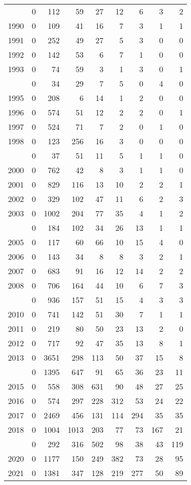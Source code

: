 \documentclass[
]{article}
\begin{document}
\begin{longtable}[t]{lrrrrrrrr}
\endfoot
\bottomrule
\endlastfoot
1989 & 0 & 112 & 59 & 27 & 12 & 6 & 3 & 2\\
1990 & 0 & 109 & 41 & 16 & 7 & 3 & 1 & 1\\
1991 & 0 & 252 & 49 & 27 & 5 & 3 & 0 & 0\\
1992 & 0 & 142 & 53 & 6 & 7 & 1 & 0 & 0\\
1993 & 0 & 74 & 59 & 3 & 1 & 3 & 0 & 1\\
\addlinespace
1994 & 0 & 34 & 29 & 7 & 5 & 0 & 4 & 0\\
1995 & 0 & 208 & 6 & 14 & 1 & 2 & 0 & 0\\
1996 & 0 & 574 & 51 & 12 & 2 & 2 & 0 & 1\\
1997 & 0 & 524 & 71 & 7 & 2 & 0 & 1 & 0\\
1998 & 0 & 123 & 256 & 16 & 3 & 0 & 0 & 0\\
\addlinespace
1999 & 0 & 37 & 51 & 11 & 5 & 1 & 1 & 0\\
2000 & 0 & 762 & 42 & 8 & 3 & 1 & 1 & 0\\
2001 & 0 & 829 & 116 & 13 & 10 & 2 & 2 & 1\\
2002 & 0 & 329 & 102 & 47 & 11 & 6 & 2 & 3\\
2003 & 0 & 1002 & 204 & 77 & 35 & 4 & 1 & 2\\
\addlinespace
2004 & 0 & 184 & 102 & 34 & 26 & 13 & 1 & 1\\
2005 & 0 & 117 & 60 & 66 & 10 & 15 & 4 & 0\\
2006 & 0 & 143 & 34 & 8 & 8 & 3 & 2 & 1\\
2007 & 0 & 683 & 91 & 16 & 12 & 14 & 2 & 2\\
2008 & 0 & 706 & 164 & 44 & 10 & 6 & 7 & 3\\
\addlinespace
2009 & 0 & 936 & 157 & 51 & 15 & 4 & 3 & 3\\
2010 & 0 & 741 & 142 & 51 & 30 & 7 & 1 & 1\\
2011 & 0 & 219 & 80 & 50 & 23 & 13 & 2 & 0\\
2012 & 0 & 717 & 92 & 47 & 35 & 13 & 8 & 1\\
2013 & 0 & 3651 & 298 & 113 & 50 & 37 & 15 & 8\\
\addlinespace
2014 & 0 & 1395 & 647 & 91 & 65 & 36 & 23 & 11\\
2015 & 0 & 558 & 308 & 631 & 90 & 48 & 27 & 25\\
2016 & 0 & 574 & 297 & 228 & 312 & 53 & 24 & 22\\
2017 & 0 & 2469 & 456 & 131 & 114 & 294 & 35 & 35\\
2018 & 0 & 1004 & 1013 & 203 & 77 & 73 & 167 & 21\\
\addlinespace
2019 & 0 & 292 & 316 & 502 & 98 & 38 & 43 & 119\\
2020 & 0 & 1177 & 150 & 249 & 382 & 73 & 28 & 95\\
2021 & 0 & 1381 & 347 & 128 & 219 & 277 & 50 & 89\\*
\end{longtable}
\end{document}
